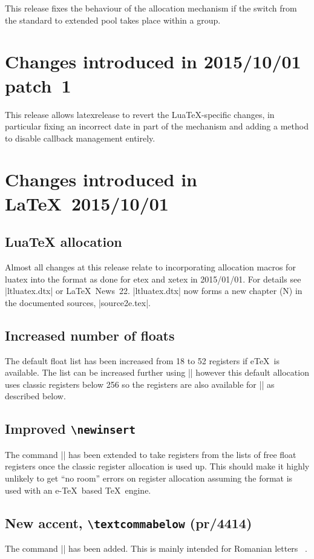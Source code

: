 \documentclass{ltxguide}
\newcommand\Lpack[1]{\mbox{\textsf{#1}}}
\newcommand\ltnewsissue[1]{\LaTeX\ News~#1}
\newcommand\ltnewsissue[1]{%
    \href{https://www.latex-project.org/news/latex2e-news/ltnews#1.pdf}{\LaTeX\ News~#1}}
\begin{document}
This release fixes the behaviour of the allocation mechanism if the switch
from the standard to extended pool takes place within a group.

\section{Changes  introduced in 2015/10/01 patch~1}
This release allows \Lpack{latexrelease} to revert the 
Lua\TeX{}-specific
changes, in particular fixing an incorrect date in part of the mechanism and
adding a method to disable callback management entirely.

\section{Changes  introduced in \LaTeX\ 2015/10/01}

\subsection{LuaTeX allocation}
Almost all changes at this release relate to incorporating allocation macros for luatex into the format
as done for etex and xetex in 2015/01/01. For details see |ltluatex.dtx| or \ltnewsissue{22}.
|ltluatex.dtx| now forms a new chapter (N) in the documented sources, |source2e.tex|.


\subsection{Increased number of floats}
The default float list has been increased from 18 to 52 registers if
e\TeX\ is available.
The list can be increased further using |\extrafloats| however this
default allocation uses classic registers below 256 so the registers are
also available for |\newinsert| as described below.

\subsection{Improved \texttt{\textbackslash newinsert}}
The command |\newinsert| has been extended to take registers from the lists of free float
registers once the classic register allocation is used up. This should make it highly unlikely
to get ``no room'' errors on register allocation assuming the format is used with
an e-\TeX\ based \TeX\ engine.

\subsection{New accent, \texttt{\textbackslash textcommabelow} (pr/4414)}
The command |\textcommabelow| has been added. This is mainly intended for Romanian letters
\,\,\,.
\end{document}
